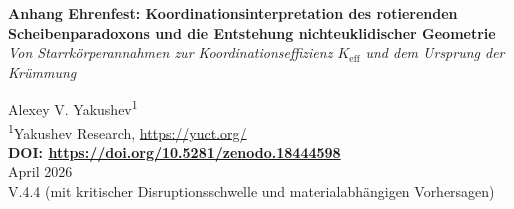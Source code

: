 \documentclass[12pt,a4paper]{article}
\begin{document}
	
	\begin{titlepage}
		\begin{center}
			\vspace*{1cm}
			\Huge\textbf{Anhang Ehrenfest: Koordinationsinterpretation des rotierenden Scheibenparadoxons und die Entstehung nichteuklidischer Geometrie} \\
			\vspace{0.5cm}
			\Large\textit{Von Starrkörperannahmen zur Koordinationseffizienz \(K_{\mathrm{eff}}\) und dem Ursprung der Krümmung}
			\vspace{1.5cm}
			
			\Large Alexey V. Yakushev\textsuperscript{1} \\
			\vspace{0.3cm}
			\large \textsuperscript{1}Yakushev Research, \url{https://yuct.org/} \\
			\vspace{1cm}
			\textbf{DOI: \url{https://doi.org/10.5281/zenodo.18444598}} \\
			\vspace{1cm}
			April 2026 \\ \large V.4.4 (mit kritischer Disruptionsschwelle und materialabhängigen Vorhersagen)
			\vspace{2cm}
			

\end{center}
\end{titlepage}
\end{document}
